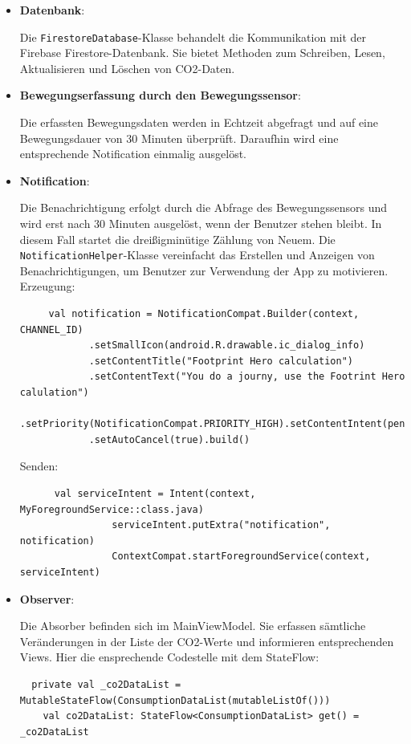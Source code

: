 \documentclass{article}
\begin{document}
\begin{itemize}
\item \textbf{Datenbank}:

Die \texttt{FirestoreDatabase}-Klasse behandelt die Kommunikation mit der Firebase Firestore-Datenbank. Sie bietet Methoden zum Schreiben, Lesen, Aktualisieren und Löschen von CO2-Daten.

\item \textbf{Bewegungserfassung durch den Bewegungssensor}:

Die erfassten Bewegungsdaten werden in Echtzeit abgefragt und auf eine Bewegungsdauer von 30 Minuten überprüft. Daraufhin wird eine entsprechende Notification einmalig ausgelöst.

\item \textbf{Notification}:

Die Benachrichtigung erfolgt durch die Abfrage des Bewegungssensors und wird erst nach 30 Minuten ausgelöst, wenn der Benutzer stehen bleibt. In diesem Fall startet die dreißigminütige Zählung von Neuem.  Die \texttt{NotificationHelper}-Klasse vereinfacht das Erstellen und Anzeigen von Benachrichtigungen, um Benutzer zur Verwendung der App zu motivieren.\\
Erzeugung:\\
    \begin{lstlisting}
     val notification = NotificationCompat.Builder(context, CHANNEL_ID)
            .setSmallIcon(android.R.drawable.ic_dialog_info)
            .setContentTitle("Footprint Hero calculation")
            .setContentText("You do a journy, use the Footrint Hero calulation")
            .setPriority(NotificationCompat.PRIORITY_HIGH).setContentIntent(pendingIntent)
            .setAutoCancel(true).build()
     \end{lstlisting}
     Senden:\\
     \begin{lstlisting}
      val serviceIntent = Intent(context, MyForegroundService::class.java)
                serviceIntent.putExtra("notification", notification)
                ContextCompat.startForegroundService(context, serviceIntent)
      \end{lstlisting}

\item \textbf{Observer}:

Die Absorber befinden sich im MainViewModel. Sie erfassen sämtliche Veränderungen in der Liste der CO2-Werte und informieren entsprechenden Views.
Hier die ensprechende Codestelle mit dem StateFlow:
\begin{lstlisting}
  private val _co2DataList = MutableStateFlow(ConsumptionDataList(mutableListOf()))
    val co2DataList: StateFlow<ConsumptionDataList> get() = _co2DataList
\end{lstlisting}


\end{itemize}
\end{document}
